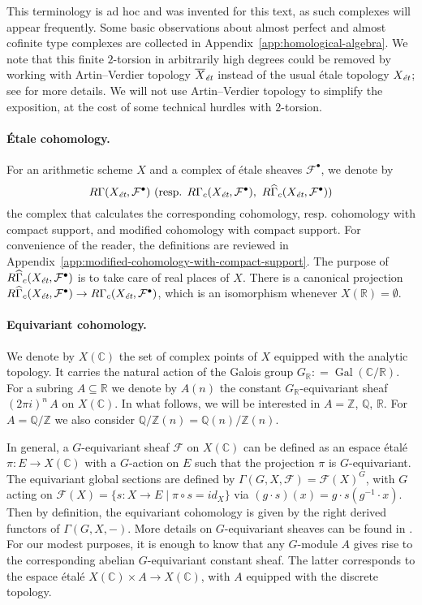 \documentclass[leqno,12pt]{article}
\theoremstyle{plain}
\theoremstyle{definition}
\DeclareMathOperator{\Gal}{Gal}
\newcommand{\ZZ}{\mathbb{Z}}
\newcommand{\QQ}{\mathbb{Q}}
\newcommand{\RR}{\mathbb{R}}
\newcommand{\CC}{\mathbb{C}}
\newcommand{\dfn}{\mathrel{\mathop:}=}
\newcommand{\et}{\text{\it \'{e}t}}
\begin{document}
This terminology is ad hoc and was invented for this text, as such complexes
will appear frequently. Some basic observations about almost perfect and almost
cofinite type complexes are collected in
Appendix~\ref{app:homological-algebra}. We note that this finite $2$-torsion
in arbitrarily high degrees could be removed by working with Artin--Verdier
topology $\overline{X}_\et$ instead of the usual \'{e}tale topology $X_\et$;
see \cite[Appendix~A]{Flach-Morin-2018} for more details. We will not use
Artin--Verdier topology to simplify the exposition, at the cost of some
technical hurdles with $2$-torsion.

\paragraph{\'{E}tale cohomology.}
For an arithmetic scheme $X$ and a complex of \'{e}tale sheaves
$\mathcal{F}^\bullet$, we denote by
\[ R\Gamma (X_\et, \mathcal{F}^\bullet) ~
\text{(resp. }R\Gamma_c (X_\et, \mathcal{F}^\bullet), ~
R\widehat{\Gamma}_c (X_\et, \mathcal{F}^\bullet)\text{)} \]
the complex that calculates the corresponding cohomology, resp. cohomology with
compact support, and modified cohomology with compact support. For convenience
of the reader, the definitions are reviewed in
Appendix~\ref{app:modified-cohomology-with-compact-support}. The purpose of
$R\widehat{\Gamma}_c (X_\et, \mathcal{F}^\bullet)$ is to take care of real
places of $X$. There is a canonical projection
$R\widehat{\Gamma}_c (X_\et, \mathcal{F}^\bullet) \to R\Gamma_c (X_\et, \mathcal{F}^\bullet)$,
which is an isomorphism whenever $X (\RR) = \emptyset$.

\paragraph{Equivariant cohomology.}
We denote by $X (\CC)$ the set of complex points of $X$ equipped with the
analytic topology. It carries the natural action of the Galois group
$G_\RR \dfn \Gal (\CC/\RR)$. For a subring $A \subseteq \RR$ we denote by
$A (n)$ the constant $G_\RR$-equivariant sheaf $(2\pi i)^n \, A$ on
$X (\CC)$. In what follows, we will be interested in $A = \ZZ$, $\QQ$, $\RR$.
For $A = \QQ/\ZZ$ we also consider $\QQ/\ZZ (n) = \QQ (n)/\ZZ (n)$.

In general, a $G$-equivariant sheaf $\mathcal{F}$ on $X (\CC)$ can be defined as
an espace \'{e}tal\'{e} $\pi\colon E\to X (\CC)$ with a $G$-action on $E$ such that the
projection $\pi$ is $G$-equivariant. The equivariant global sections are defined
by $\Gamma (G,X,\mathcal{F}) = \mathcal{F} (X)^G$, with $G$ acting on
$\mathcal{F} (X) = \{ s\colon X\to E \mid \pi\circ s = id_X \}$ via
$(g\cdot s) (x) = g\cdot s (g^{-1}\cdot x)$. Then by definition, the equivariant
cohomology is given by the right derived functors of $\Gamma (G,X,-)$. More
details on $G$-equivariant sheaves can be found in
\cite[Chapitre~2]{Morin-these}. For our modest purposes, it is enough to know
that any $G$-module $A$ gives rise to the corresponding abelian $G$-equivariant
constant sheaf. The latter corresponds to the espace \'{e}tal\'{e}
$X (\CC)\times A \to X (\CC)$, with $A$ equipped with the discrete topology.
\end{document}

